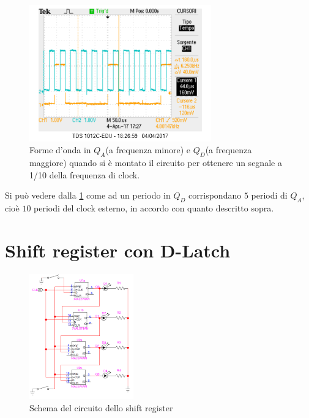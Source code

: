 \documentclass[a4paper,10pt]{article}
\begin{document}
\begin{figure}[H]
	\centering
	\includegraphics[width=0.7\textwidth]{../grafici/81.png}
	\caption{Forme d'onda in $Q_A$(a frequenza minore) e $Q_D$(a frequenza maggiore) quando si è montato il circuito per ottenere un segnale a 1/10 della frequenza di clock.}
	\label{fig:81}
\end{figure}

Si può vedere dalla \cref{fig:81} come ad un periodo in $Q_D$ corrispondano $5$ periodi di $Q_A$, cioè $10$ periodi del clock esterno, in accordo con quanto descritto sopra.

\pagebreak

\section{Shift register con D-Latch}

\begin{figure}
	\vspace{-20pt}
	\centering
	\includegraphics[width=0.4\textwidth]{../grafici/shiftreg.png}
	\vspace{-10pt}
	\caption{Schema del circuito dello shift register}
	\label{fig:shift}
	\vspace{-40pt}
\end{figure}
\end{document}
